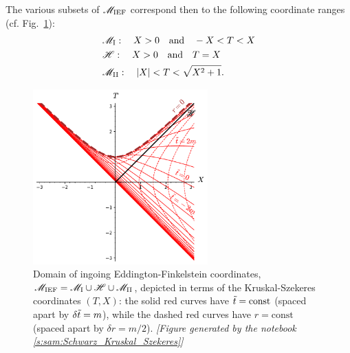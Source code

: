     \iff
\ee
The various subsets of $\mathscr{M}_{\rm IEF}$ correspond then to the following
coordinate ranges (cf. Fig.~\ref{f:sch:IEF_KS}):
\begin{subequations}
\label{e:max:range_TX_M_I_II}
\begin{align}
 & \mathscr{M}_{\rm I}: \quad X > 0 \quad\mbox{and}\quad -X < T < X \\
 & \mathscr{H}: \quad X > 0 \quad\mbox{and}\quad  T = X \\
 & \mathscr{M}_{\rm II}: \quad |X| < T < \sqrt{X^2+1} .
\end{align}
\end{subequations}

\begin{figure}
\centerline{\includegraphics[width=0.6\textwidth]{max_IEF_KS.pdf}}
\caption[]{\label{f:sch:IEF_KS} \footnotesize
Domain of ingoing Eddington-Finkelstein coordinates, $\mathscr{M}_{\rm IEF} = \mathscr{M}_{\rm I}\cup \mathscr{H}\cup \mathscr{M}_{\rm II}$, depicted in terms of the Kruskal-Szekeres coordinates $(T,X)$: the solid red
curves have ${\tilde t}=\mathrm{const}$ (spaced apart by $\delta{\tilde t} = m$), while the
dashed red curves have $r=\mathrm{const}$ (spaced apart by $\delta r = m/2$).
\textsl{[Figure generated by the notebook \ref{s:sam:Schwarz_Kruskal_Szekeres}]}
}
\end{figure}


